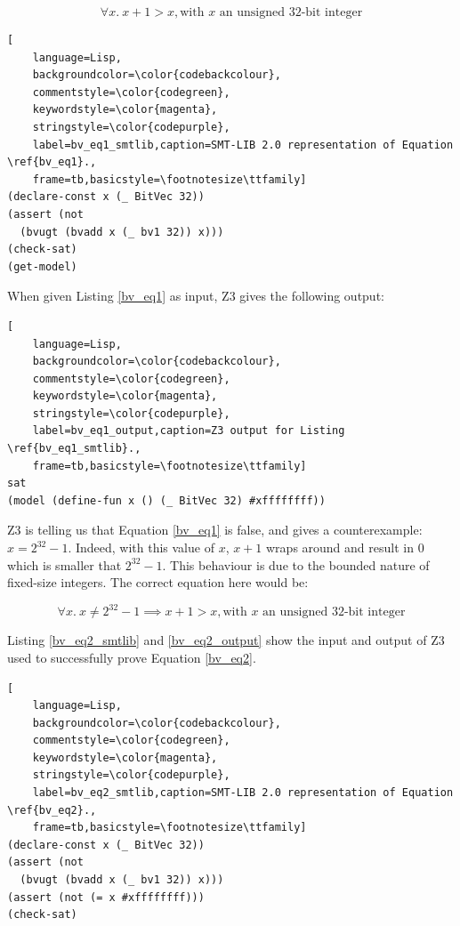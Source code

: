 \documentclass{kththesis}
\begin{document}
\begin{equation}
    \forall x.~ x + 1 > x, \text{with $x$ an unsigned 32-bit integer}
    \label{bv_eq1}
\end{equation}

\begin{lstlisting}[
    language=Lisp,
    backgroundcolor=\color{codebackcolour},
    commentstyle=\color{codegreen},
    keywordstyle=\color{magenta},
    stringstyle=\color{codepurple},
    label=bv_eq1_smtlib,caption=SMT-LIB 2.0 representation of Equation \ref{bv_eq1}.,
    frame=tb,basicstyle=\footnotesize\ttfamily]
(declare-const x (_ BitVec 32))
(assert (not
  (bvugt (bvadd x (_ bv1 32)) x)))
(check-sat)
(get-model)
\end{lstlisting}

When given Listing \ref{bv_eq1} as input, Z3 gives the following output:

\begin{lstlisting}[
    language=Lisp,
    backgroundcolor=\color{codebackcolour},
    commentstyle=\color{codegreen},
    keywordstyle=\color{magenta},
    stringstyle=\color{codepurple},
    label=bv_eq1_output,caption=Z3 output for Listing \ref{bv_eq1_smtlib}.,
    frame=tb,basicstyle=\footnotesize\ttfamily]
sat
(model (define-fun x () (_ BitVec 32) #xffffffff))
\end{lstlisting}

Z3 is telling us that Equation \ref{bv_eq1} is false, and gives a counterexample: $x=2^{32}-1$. Indeed, with this value of $x$, $x+1$ wraps around and result in $0$ which is smaller that $2^{32}-1$. This behaviour is due to the bounded nature of fixed-size integers. The correct equation here would be:

\begin{equation}
    \forall x.~ x \neq 2^{32}-1 \implies x+1>x, \text{with $x$ an unsigned 32-bit integer}
    \label{bv_eq2}
\end{equation}

Listing \ref{bv_eq2_smtlib} and \ref{bv_eq2_output} show the input and output of Z3 used to successfully prove Equation \ref{bv_eq2}.

\begin{lstlisting}[
    language=Lisp,
    backgroundcolor=\color{codebackcolour},
    commentstyle=\color{codegreen},
    keywordstyle=\color{magenta},
    stringstyle=\color{codepurple},
    label=bv_eq2_smtlib,caption=SMT-LIB 2.0 representation of Equation \ref{bv_eq2}.,
    frame=tb,basicstyle=\footnotesize\ttfamily]
(declare-const x (_ BitVec 32))
(assert (not
  (bvugt (bvadd x (_ bv1 32)) x)))
(assert (not (= x #xffffffff)))
(check-sat)
\end{lstlisting}
\end{document}
